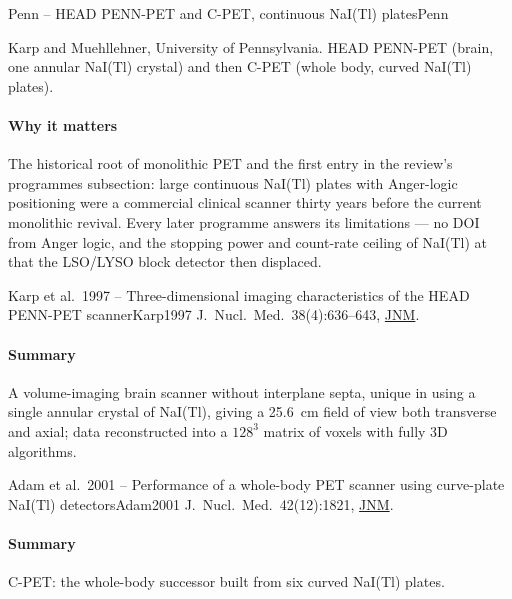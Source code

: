 \begin{programnote}{Penn -- HEAD PENN-PET and C-PET, continuous NaI(Tl) plates}{Penn}

Karp and Muehllehner, University of Pennsylvania. HEAD PENN-PET (brain, one
annular NaI(Tl) crystal) and then C-PET (whole body, curved NaI(Tl) plates).

\paragraph{Why it matters}
The historical root of monolithic PET and the first entry in the review's
programmes subsection: large continuous NaI(Tl) plates with Anger-logic
positioning were a commercial clinical scanner thirty years before the current
monolithic revival. Every later programme answers its limitations --- no DOI from
Anger logic, and the stopping power and count-rate ceiling of NaI(Tl) at
 that the LSO/LYSO block detector then displaced.

\begin{papernote}{Karp et al.\ 1997 -- Three-dimensional imaging characteristics of the HEAD PENN-PET scanner}{Karp1997}
J.\ Nucl.\ Med.\ 38(4):636--643, \href{https://jnm.snmjournals.org/content/38/4/636.long}{JNM}.

\paragraph{Summary}
A volume-imaging brain scanner without interplane septa, unique in using a
single annular crystal of NaI(Tl), giving a \qty{25.6}{\centi\metre} field of
view both transverse and axial; data reconstructed into a $128^3$ matrix of
 voxels with fully 3D algorithms.

\end{papernote}

\begin{papernote}{Adam et al.\ 2001 -- Performance of a whole-body PET scanner using curve-plate NaI(Tl) detectors}{Adam2001}
J.\ Nucl.\ Med.\ 42(12):1821, \href{https://jnm.snmjournals.org/content/42/12/1821}{JNM}.

\paragraph{Summary}
C-PET: the whole-body successor built from six curved NaI(Tl) plates.

\end{papernote}

\end{programnote}


